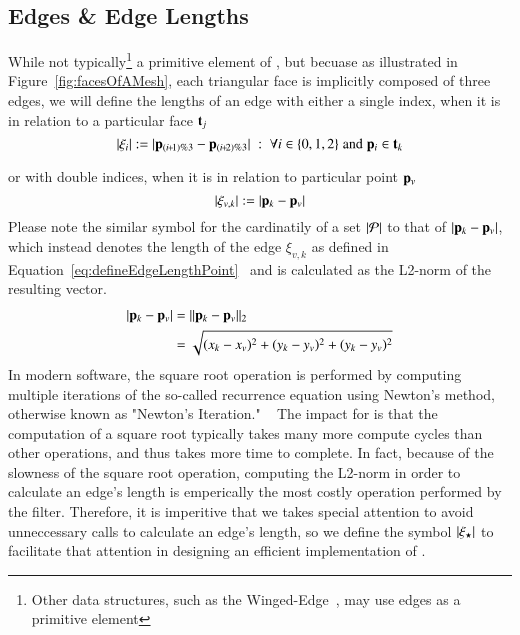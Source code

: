 \subsection{Edges \& Edge Lengths}
\label{chBsEEL}
While not typically\footnote{Other data structures, such as the Winged-Edge~\cite[p.~1]{Baumgart75}, may use edges as a primitive element} a primitive element of \tdd{}, but becuase as illustrated in Figure~\ref{fig:facesOfAMesh}, each triangular face is implicitly composed of three edges, we will define the lengths of an edge with either a single index, when it is in relation to a particular face $\mathbf{t}_j$
\begin{equation}
	|\xi_i| := |\bp_{(\sipo)\%3} - \bp_{(\sipt)\%3}| \;:\; \forall i \in\{0,1,2\} \;\text{and}\; \bp_i \in \bt_k
	\label{eq:defineEdgeLengthFace}
\end{equation}%

or with double indices, when it is in relation to particular point $\mathbf{p}_v$
\begin{equation}
	|\xi_{v,k}| := |\mathbf{p}_k - \mathbf{p}_v|
	\label{eq:defineEdgeLengthPoint}
\end{equation}%
%
Please note the similar symbol for the cardinatily of a set $|\mathcal{P}|$ to that of $|\mathbf{p}_k - \mathbf{p}_v|$, which instead denotes the length of the edge $\xi_{v,k}$ as defined in Equation~\ref{eq:defineEdgeLengthPoint}~\cite[p.~26]{Mara12} and is calculated as the L2-norm of the resulting vector.
%
\begin{align}
	|\mathbf{p}_k - \mathbf{p}_v| & = \lVert\mathbf{p}_k - \mathbf{p}_v\rVert_2 \\
					& = \sqrt{(x_k-x_v)^2 + (y_k-y_v)^2 + (y_k-y_v)^2}
	\label{eq:defineEdgeLengthCalc}
\end{align}
%
In modern software, the square root operation is performed by computing multiple iterations of the so-called recurrence equation using Newton's method, otherwise known as "Newton's Iteration." ~\cite{Weisstein19b} The impact for  is that the computation of a square root typically takes many more compute cycles than other operations, and thus takes more time to complete. In fact, because of the slowness of the square root operation, computing the L2-norm in order to calculate an edge's length is emperically the most costly operation performed by the filter.  Therefore, it is imperitive that we takes special attention to avoid unneccessary calls to calculate an edge's length, so we define the symbol $\left |\xi_\star \right |$ to facilitate that attention in designing an efficient implementation of .
%
